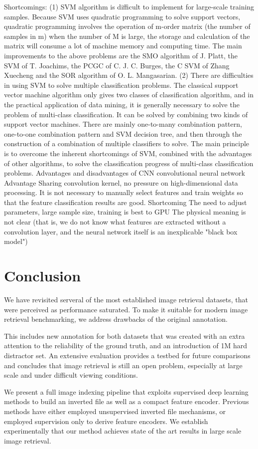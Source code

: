 \documentclass[12pt]{report}
\begin{document}
Shortcomings:
(1) SVM algorithm is difficult to implement for large-scale training samples.
Because SVM uses quadratic programming to solve support vectors, quadratic programming involves the operation of m-order matrix (the number of samples in m) when the number of M is large, the storage and calculation of the matrix will consume a lot of machine memory and computing time. The main improvements to the above problems are the SMO algorithm of J. Platt, the SVM of T. Joachims, the PCGC of C. J. C. Burges, the C SVM of Zhang Xuecheng and the SOR algorithm of O. L. Mangasarian.
 (2) There are difficulties in using SVM to solve multiple classification problems.
The classical support vector machine algorithm only gives two classes of classification algorithm, and in the practical application of data mining, it is generally necessary to solve the problem of multi-class classification. It can be solved by combining two kinds of support vector machines. There are mainly one-to-many combination pattern, one-to-one combination pattern and SVM decision tree, and then through the construction of a combination of multiple classifiers to solve. The main principle is to overcome the inherent shortcomings of SVM, combined with the advantages of other algorithms, to solve the classification progress of multi-class classification problems.
Advantages and disadvantages of CNN convolutional neural network
Advantage
Sharing convolution kernel, no pressure on high-dimensional data processing.
It is not necessary to manually select features and train weights so that the feature classification results are good.
Shortcoming
The need to adjust parameters, large sample size, training is best to GPU
The physical meaning is not clear (that is, we do not know what features are extracted without a convolution layer, and the neural network itself is an inexplicable "black box model")




\chapter{Conclusion}

We have revisited serveral of the most established image retrieval
datasets, that were perceived as performance saturated.
To make it suitable for modern image retrieval benchmarking,
we address drawbacks of the original annotation.

This includes new annotation for both datasets that was created
with an extra attention to the reliability of the ground
truth, and an introduction of 1M hard distractor set.
An extensive evaluation provides a testbed for future
comparisons and concludes that image retrieval is still an
open problem, especially at large scale and under difficult
viewing conditions.

We present a full image indexing pipeline that exploits
supervised deep learning methods to build an inverted file as
well as a compact feature encoder. Previous methods have
either employed unsupervised inverted file mechanisms, or
employed supervision only to derive feature encoders. We
establish experimentally that our method achieves state of
the art results in large scale image retrieval.


\end{document}

